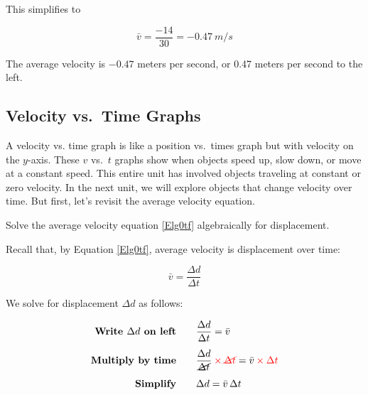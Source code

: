 \documentclass[../main.tex]{subfiles}
\begin{document}
This simplifies to

\begin{equation*}
    \bar{v} = \frac{-14}{30} = -\SI{0.47}{m/s}
\end{equation*}

The average velocity is $-0.47$ meters per second, or 0.47 meters per second to the left.


\vspace{1em}

\cyanhrule





\cyanhrule

\subsection{Velocity vs.~Time Graphs} \label{EOqf0D}

A \gls{velocity vs. time graph} is like a position vs.~times graph but with velocity on the $y$-axis. These $v$ vs.~$t$ graphs show when objects speed up, slow down, or move at a constant speed. This entire unit has involved objects traveling at constant or zero velocity. In the next unit, we will explore objects that change velocity over time. But first, let's revisit the average velocity equation.

\begin{example}
    Solve the average velocity equation \eqref{Elg0tf} algebraically for displacement.
\end{example}

\Solution Recall that, by Equation \eqref{Elg0tf}, average velocity is displacement over time:

\begin{equation*}
    \bar{v} = \frac{\Delta{d}}{\Delta{t}}
\end{equation*}

We solve for displacement $\Delta{d}$ as follows:

\begin{align*}
    \textbf{Write $\Delta{d}$ on left} \qquad & \frac{\Delta{d}}{\Delta{t}} = \bar{v}\\[1ex]
    \textbf{Multiply by time} \qquad & \frac{\Delta{d}}{\cancel{\Delta{t}}} \mathbin{\color{red} \times} \textcolor{red}{\cancel{\Delta{t}}} = \bar{v} \mathbin{\color{red} \times} \textcolor{red}{\Delta{t}}\\[1ex]
    \textbf{Simplify} \qquad & \Delta{d} = \bar{v}\,\Delta{t}
\end{align*}
\end{document}
